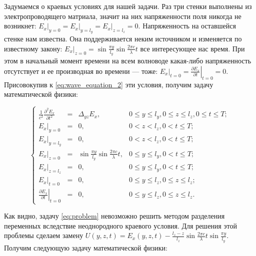 Задумаемся о краевых условиях для нашей задачи. Раз три стенки выполнены из электропроводящего матриала, значит на них напряженности поля никогда не возникнет: $\left. E_x \right|_{y=0} = \left. E_x \right|_{y=l_y} = \left. E_x \right|_{z=l_z} = 0$. Напряженность на оставшейся стенке нам известна. Она поддерживается неким источником и изменяется по известному закону: $\left. E_x \right|_{z=0} = \sin\frac{\pi y}{l_y} \sin\frac{2 \pi c}{\lambda}t$ все интересующее нас время. При этом в начальный момент времени на всем волноводе какая-либо напряженность отсутствует и ее производная во времени --- тоже: $\left. E_x \right|_{t=0} = \left. \frac{\partial E_x}{\partial t} \right|_{t=0} = 0$. Присовокупив к \eqref{eq:wave_equation_2} эти условия, получим задачу математической физики:

\begin{equation}
\label{eq:problem}
\left\{
\begin{array}{rclr}
\frac{1}{c^2} \frac{\partial^2 E_x}{\partial t^2} &=& \Delta_{yz} E_x, & 0 \le y \le l_y, 0 \le z \le l_z, 0 \le t \le T; \\
\left. E_x \right|_{y=0} & = & 0, & 0 < z < l_z, 0 < t \le T; \\
\left. E_x \right|_{y=l_y} & = & 0, & 0 < z < l_z, 0 < t \le T; \\
\left. E_x \right|_{z=0} &=&  \sin\frac{\pi y}{l_y} \sin\frac{2 \pi c}{\lambda} t, & 0 \le y \le l_y, 0 < t \le T; \\
\left. E_x \right|_{z=l_z} &=& 0, & 0 \le y \le l_y, 0 < t \le T; \\
\left. E_x \right|_{t=0} & = & 0, & 0 \le y \le l_z, 0 \le z \le l_z; \\
\left. \frac{\partial E_x}{\partial t} \right|_{t=0} &=& 0, & 0 \le y \le l_z, 0 \le z \le l_z.
\end{array}
\right.
\end{equation}

Как видно, задачу \eqref{eq:problem} невозможно решить методом разделения переменных вследствие неоднородного краевого условия. Для решения этой
проблемы сделаем замену $U(y, z, t) = E_x(y, z, t) - \frac{l_z - z}{l_z} \sin\frac{2 \pi c}{\lambda}t \sin\frac{\pi y}{l_y}$. Получим следующую задачу
математической физики:

